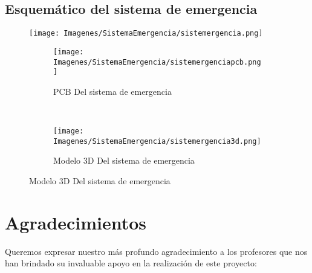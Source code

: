 \documentclass{article}
\begin{document}
\subsection{Esquemático del sistema de emergencia}
\begin{figure}[H]
    \centering
    \texttt{[image: Imagenes/SistemaEmergencia/sistemergencia.png]}
    \caption{Esquemático del sistema de emegencia}


    \begin{subfigure}[t]{0.5\textwidth}
        \centering
        \texttt{[image: Imagenes/SistemaEmergencia/sistemergenciapcb.png]}
        \caption{PCB Del sistema de emergencia}
    \end{subfigure}%
    ~ 
    \begin{subfigure}[t]{0.5\textwidth}
        \centering
        \texttt{[image: Imagenes/SistemaEmergencia/sistemergencia3d.png]}
        \caption{Modelo 3D Del sistema de emergencia}
    \end{subfigure}

\end{figure}


\newpage

\section{Agradecimientos}
Queremos expresar nuestro más profundo agradecimiento a los profesores que nos han brindado su invaluable apoyo en la realización de este proyecto:
\end{document}
